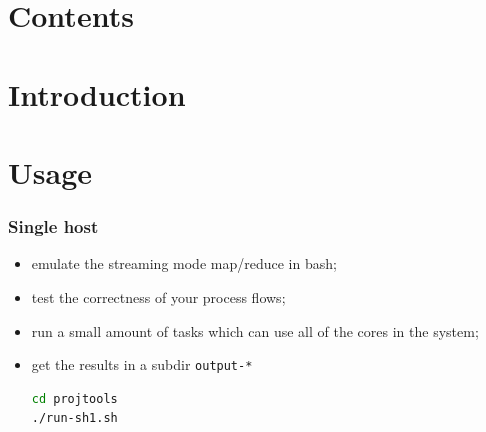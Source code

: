 \documentclass{beamer}
\title{\sc{\doctitle}}
\author{\docauthor}
\theoremstyle{definition}
\theoremstyle{remark}
\begin{document}
\frame{\titlepage}
\section*{Contents}%
\frame{\tableofcontents}



\section{Introduction}





\section{Usage}

\begin{frame}[fragile]
  \frametitle<presentation>{Single host}

    \begin{itemize}
      \item emulate the streaming mode map/reduce in bash;
      \item test the correctness of your process flows;
      \item run a small amount of tasks which can use all of the cores in the system;

      \item get the results in a subdir \texttt{output-*}
\begin{lstlisting}[language=bash]
cd projtools
./run-sh1.sh
\end{lstlisting}
    \end{itemize}

\end{frame}
\end{document}
